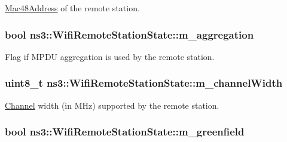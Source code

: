 \hyperlink{classns3_1_1Mac48Address}{Mac48\+Address} of the remote station. 

\subsubsection[{\texorpdfstring{m\+\_\+aggregation}{m_aggregation}}]{\setlength{\rightskip}{0pt plus 5cm}bool ns3\+::\+Wifi\+Remote\+Station\+State\+::m\+\_\+aggregation}\hypertarget{structns3_1_1WifiRemoteStationState_a83a20126c91366c8b8ba144122813ae0}{}\label{structns3_1_1WifiRemoteStationState_a83a20126c91366c8b8ba144122813ae0}


Flag if M\+P\+DU aggregation is used by the remote station. 

\subsubsection[{\texorpdfstring{m\+\_\+channel\+Width}{m_channelWidth}}]{\setlength{\rightskip}{0pt plus 5cm}uint8\+\_\+t ns3\+::\+Wifi\+Remote\+Station\+State\+::m\+\_\+channel\+Width}\hypertarget{structns3_1_1WifiRemoteStationState_a05f3669bfd023b4cf9c43b3cf7de36cb}{}\label{structns3_1_1WifiRemoteStationState_a05f3669bfd023b4cf9c43b3cf7de36cb}


\hyperlink{classns3_1_1Channel}{Channel} width (in M\+Hz) supported by the remote station. 

\subsubsection[{\texorpdfstring{m\+\_\+greenfield}{m_greenfield}}]{\setlength{\rightskip}{0pt plus 5cm}bool ns3\+::\+Wifi\+Remote\+Station\+State\+::m\+\_\+greenfield}\hypertarget{structns3_1_1WifiRemoteStationState_af160002f58992a1e4a175d61115e108b}{}\label{structns3_1_1WifiRemoteStationState_af160002f58992a1e4a175d61115e108b}


